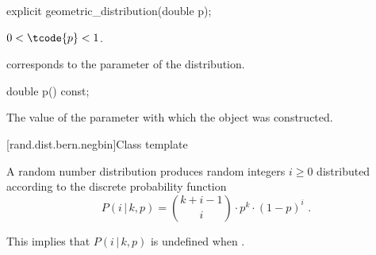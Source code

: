 %
\begin{itemdecl}
explicit geometric_distribution(double p);
\end{itemdecl}

\begin{itemdescr}
\pnum
\expects
$0 < \tcode{p} < 1$.

\pnum
\remarks
 corresponds to the parameter of the distribution.
\end{itemdescr}

%
\begin{itemdecl}
double p() const;
\end{itemdecl}

\begin{itemdescr}
\pnum
\returns
The value of the  parameter
 with which the object was constructed.
\end{itemdescr}


[rand.dist.bern.negbin]{Class template }
%

\pnum
A  random number distribution
produces random integers $i \geq 0$
distributed according to
the discrete probability function
\[ P(i\,|\,k,p) = \binom{k+i-1}{i} \cdot p^k \cdot (1-p)^i \text{ .} \]
\begin{note}
This implies that $P(i\,|\,k,p)$ is undefined when .
\end{note}

